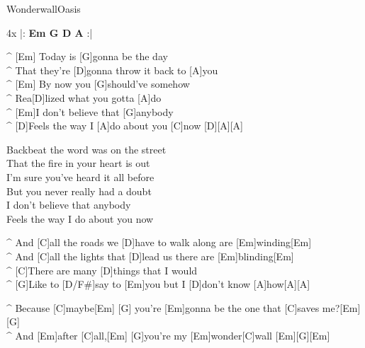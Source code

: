 \begin{song}{Wonderwall}{Oasis}

\begin{guitar}
4x |: \textbf{Em  G  D  A } :|\\
\end{guitar}

\begin{guitar}
^ [Em]  Today is [G]gonna be the day \\
^ That they're [D]gonna throw it back to [A]you \\
^ [Em]  By now you [G]should've somehow \\
^ Rea[D]lized what you gotta [A]do \\
^ [Em]I don't believe that [G]anybody \\
^ [D]Feels the way I [A]do about you [C]now [D][A][A]\\
\end{guitar}

\begin{guitar}
Backbeat the word was on the street \\
That the fire in your heart is out \\
I'm sure you've heard it all before \\
But you never really had a doubt \\
I don't believe that anybody\\
Feels the way I do about you now \\
\end{guitar}

\begin{guitar}
^ And [C]all the roads we [D]have to walk along are [Em]winding[Em] \\
^ And [C]all the lights that [D]lead us there are [Em]blinding[Em] \\
^ [C]There are many [D]things that I would \\
^ [G]Like to [D/F#]say to [Em]you but I [D]don't know [A]how[A][A]\\
\end{guitar}

\begin{guitar}
^ Because [C]maybe[Em]    [G]  you're [Em]gonna be the one that [C]saves me?[Em][G]\\
^ And [Em]after [C]all,[Em]    [G]you're my [Em]wonder[C]wall [Em][G][Em]\\
\end{guitar}


\end{song}
